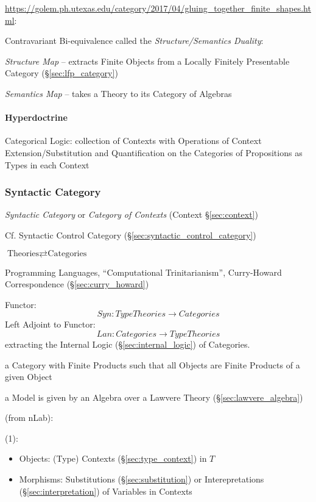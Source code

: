 \url{https://golem.ph.utexas.edu/category/2017/04/gluing_together_finite_shapes.html}:

Contravariant Bi-equivalence called the \emph{Structure/Semantics
  Duality}:

\emph{Structure Map} -- extracts Finite Objects from a Locally
Finitely Presentable Category (\S\ref{sec:lfp_category})

\emph{Semantics Map} -- takes a Theory to its Category of Algebras



\paragraph{Hyperdoctrine}\label{sec:hyperdoctrine}\hfill

Categorical Logic: collection of Contexts with Operations of Context
Extension/Substitution and Quantification on the Categories of
Propositions as Types in each Context



\subsubsection{Syntactic Category}\label{sec:syntactic_category}

\emph{Syntactic Category} or \emph{Category of Contexts} (Context
\S\ref{sec:context})

\fist Cf. Syntactic Control Category
(\S\ref{sec:syntactic_control_category})

$\text{Theories} \rightleftarrows \text{Categories}$

Programming Languages, ``Computational Trinitarianism'', Curry-Howard
Correspondence (\S\ref{sec:curry_howard})

Functor:
\[
  Syn : TypeTheories \rightarrow Categories
\]
Left Adjoint to Functor:
\[
  Lan : Categories \rightarrow TypeTheories
\]
extracting the Internal Logic (\S\ref{sec:internal_logic}) of
Categories.

a Category with Finite Products such
that all Objects are Finite Products of a given Object %

a Model is given by an Algebra over a Lawvere Theory
(\S\ref{sec:lawvere_algebra})


(from nLab):

(1):

\begin{itemize}
  \item Objects: (Type) Contexts (\S\ref{sec:type_context}) in $T$
  \item Morphisms: Substitutions (\S\ref{sec:substitution}) or
    Interepretations (\S\ref{sec:interpretation}) of Variables in
    Contexts
\end{itemize}

